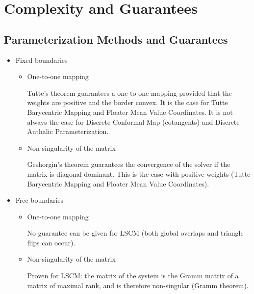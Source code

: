 \section{Complexity and Guarantees}


\subsection{Parameterization Methods and Guarantees}

\begin{itemize}

\item Fixed boundaries

    \begin{itemize}

    \item One-to-one mapping

        Tutte's theorem guarantees a one-to-one mapping provided that the weights are positive
        and the border convex.
        It is the case for Tutte Barycentric Mapping and Floater Mean Value Coordinates.
        It is not always the case for Discrete Conformal Map (cotangents) and
        Discrete Authalic Parameterization.

    \item Non-singularity of the matrix

        Geshorgin's theorem guarantees the convergence of the solver if the matrix is diagonal dominant.
        This is the case with positive weights (Tutte Barycentric Mapping and Floater Mean Value
        Coordinates).

    \end{itemize}

\item Free boundaries

    \begin{itemize}

    \item One-to-one mapping

        No guarantee can be given for LSCM (both global overlaps and triangle flips can
        occur).

    \item Non-singularity of the matrix

        Proven for LSCM: the matrix of the system is the Gramm matrix of a matrix of maximal rank,
        and is therefore non-singular (Gramm theorem).

    \end{itemize}

\end{itemize}


